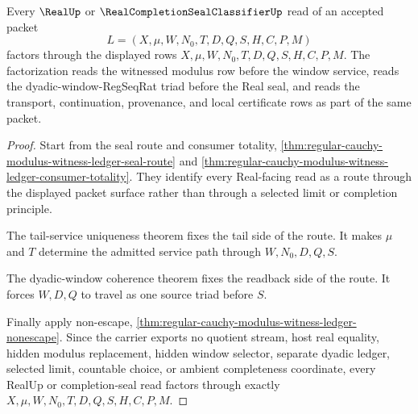\begin{theorem}
\label{thm:regular-cauchy-modulus-witness-ledger-seal-readback-factorization}
Every $\RealUp$ or $\RealCompletionSealClassifierUp$ read of an accepted packet
$$
L=(X,\mu,W,N_0,T,D,Q,S,H,C,P,M)
$$
factors through the displayed rows $X,\mu,W,N_0,T,D,Q,S,H,C,P,M$. The factorization reads the witnessed modulus row before the window service, reads the dyadic-window-RegSeqRat triad before the Real seal, and reads the transport, continuation, provenance, and local certificate rows as part of the same packet.
\end{theorem}
\begin{proof}
Start from the seal route and consumer totality, \autoref{thm:regular-cauchy-modulus-witness-ledger-seal-route} and \autoref{thm:regular-cauchy-modulus-witness-ledger-consumer-totality}. They identify every Real-facing read as a route through the displayed packet surface rather than through a selected limit or completion principle.

The tail-service uniqueness theorem fixes the tail side of the route. It makes $\mu$ and $T$ determine the admitted service path through $W,N_0,D,Q,S$.

The dyadic-window coherence theorem fixes the readback side of the route. It forces $W,D,Q$ to travel as one source triad before $S$.

Finally apply non-escape, \autoref{thm:regular-cauchy-modulus-witness-ledger-nonescape}. Since the carrier exports no quotient stream, host real equality, hidden modulus replacement, hidden window selector, separate dyadic ledger, selected limit, countable choice, or ambient completeness coordinate, every RealUp or completion-seal read factors through exactly $X,\mu,W,N_0,T,D,Q,S,H,C,P,M$.
\end{proof}

